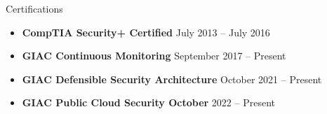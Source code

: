 \documentclass[]{mcdowellcv}
\begin{document}
\begin{cvsection}{Certifications}
	\begin{cvsubsection}{}{}{}
		\begin{itemize}
			\setlength\itemsep{3pt}
			\item \textbf{CompTIA Security+ Certified} \hfill July 2013 – July 2016
			\item \textbf{GIAC Continuous Monitoring} \hfill  September 2017 – Present
            \item \textbf{GIAC Defensible Security Architecture} \hfill  October 2021 – Present
            \item \textbf{GIAC Public Cloud Security October} \hfill  2022 – Present
		\end{itemize}
	\end{cvsubsection}
\end{cvsection}

\customfooter
\end{document}
